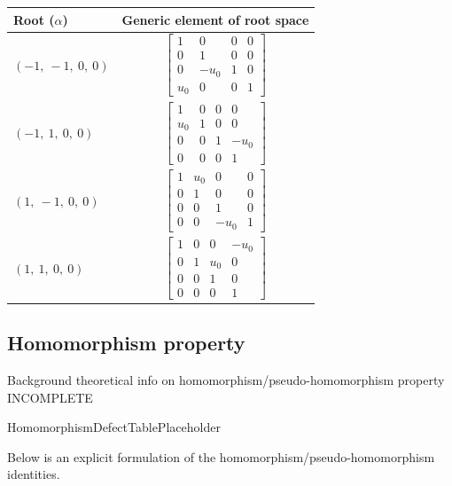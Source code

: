 \documentclass[11pt]{article}
\newcommand{\noi}{\noindent}
\theoremstyle{definition}
\begin{document}
\noindent \begin{tabular}{|l|c|}
    \hline
    \textbf{Root ($\alpha$)} & \textbf{Generic element of root space} \\
    \hline
    $\left( -1, \  -1, \  0, \  0\right)$ & $\left[\begin{matrix}1 & 0 & 0 & 0\\0 & 1 & 0 & 0\\0 & - u_{0} & 1 & 0\\u_{0} & 0 & 0 & 1\end{matrix}\right]$ \\
    \hline
    $\left( -1, \  1, \  0, \  0\right)$ & $\left[\begin{matrix}1 & 0 & 0 & 0\\u_{0} & 1 & 0 & 0\\0 & 0 & 1 & - u_{0}\\0 & 0 & 0 & 1\end{matrix}\right]$ \\
    \hline
    $\left( 1, \  -1, \  0, \  0\right)$ & $\left[\begin{matrix}1 & u_{0} & 0 & 0\\0 & 1 & 0 & 0\\0 & 0 & 1 & 0\\0 & 0 & - u_{0} & 1\end{matrix}\right]$ \\
    \hline
    $\left( 1, \  1, \  0, \  0\right)$ & $\left[\begin{matrix}1 & 0 & 0 & - u_{0}\\0 & 1 & u_{0} & 0\\0 & 0 & 1 & 0\\0 & 0 & 0 & 1\end{matrix}\right]$ \\
    \hline
\end{tabular}


\subsection{Homomorphism property}

\noi Background theoretical info on homomorphism/pseudo-homomorphism property INCOMPLETE

\bigskip

HomomorphismDefectTablePlaceholder

\noi Below is an explicit formulation of the homomorphism/pseudo-homomorphism identities.

\bigskip
\end{document}
